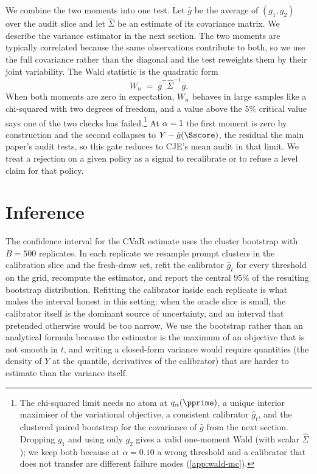 \documentclass[11pt]{article}
\newcommand{\CJE}{\textsc{CJE}}
\begin{document}
We combine the two moments into one test. Let $\bar g$ be the average of $(g_1, g_2)$ over the audit slice and let $\hat\Sigma$ be an estimate of its covariance matrix. We describe the variance estimator in the next section. The two moments are typically correlated because the same observations contribute to both, so we use the full covariance rather than the diagonal and the test reweights them by their joint variability. The Wald statistic is the quadratic form
\begin{equation}\label{eq:wald}
W_n \;=\; \bar g^{\top} \hat\Sigma^{-1} \bar g.
\end{equation}
When both moments are zero in expectation, $W_n$ behaves in large samples like a chi-squared with two degrees of freedom, and a value above the $5\%$ critical value says one of the two checks has failed.\footnote{The chi-squared limit needs no atom at $q_\alpha(\pprime)$, a unique interior maximiser of the variational objective, a consistent calibrator $\hat g_t$, and the clustered paired bootstrap for the covariance of $\bar g$ from the next section. Dropping $g_1$ and using only $g_2$ gives a valid one-moment Wald (with scalar $\hat\Sigma$); we keep both because at $\alpha = 0.10$ a wrong threshold and a calibrator that does not transfer are different failure modes (\cref{app:wald-mc}).} At $\alpha = 1$ the first moment is zero by construction and the second collapses to $Y - \hat g(\Sscore)$, the residual the main paper's audit tests, so this gate reduces to \CJE's mean audit in that limit. We treat a rejection on a given policy as a signal to recalibrate or to refuse a level claim for that policy.

\section{Inference}

The confidence interval for the CVaR estimate uses the cluster bootstrap with $B = 500$ replicates. In each replicate we resample prompt clusters in the calibration slice and the fresh-draw set, refit the calibrator $\hat g_t$ for every threshold on the grid, recompute the estimator, and report the central $95\%$ of the resulting bootstrap distribution. Refitting the calibrator inside each replicate is what makes the interval honest in this setting: when the oracle slice is small, the calibrator itself is the dominant source of uncertainty, and an interval that pretended otherwise would be too narrow. We use the bootstrap rather than an analytical formula because the estimator is the maximum of an objective that is not smooth in $t$, and writing a closed-form variance would require quantities (the density of $Y$ at the quantile, derivatives of the calibrator) that are harder to estimate than the variance itself.
\end{document}
